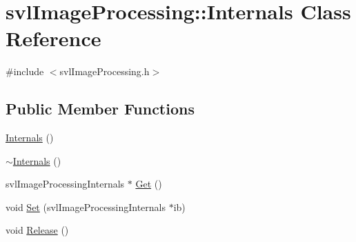 \hypertarget{classsvl_image_processing_1_1_internals}{\section{svl\-Image\-Processing\-:\-:Internals Class Reference}
\label{classsvl_image_processing_1_1_internals}
}


{\ttfamily \#include $<$svl\-Image\-Processing.\-h$>$}

\subsection*{Public Member Functions}
\begin{DoxyCompactItemize}
\item 
\hyperlink{classsvl_image_processing_1_1_internals_a479f2472483e3c24636901d90e7d46a8}{Internals} ()
\item 
\hyperlink{classsvl_image_processing_1_1_internals_a3df7b67feba697b33b0746e19adc5d4b}{$\sim$\-Internals} ()
\item 
svl\-Image\-Processing\-Internals $\ast$ \hyperlink{classsvl_image_processing_1_1_internals_aed6715392a7812f749e0c5b9ffff1ed2}{Get} ()
\item 
void \hyperlink{classsvl_image_processing_1_1_internals_a74b955a02e110d4a16c08336ce93cb94}{Set} (svl\-Image\-Processing\-Internals $\ast$ib)
\item 
void \hyperlink{classsvl_image_processing_1_1_internals_ac7bd4e48010f4b310f12cf0453fc2e73}{Release} ()
\end{DoxyCompactItemize}


